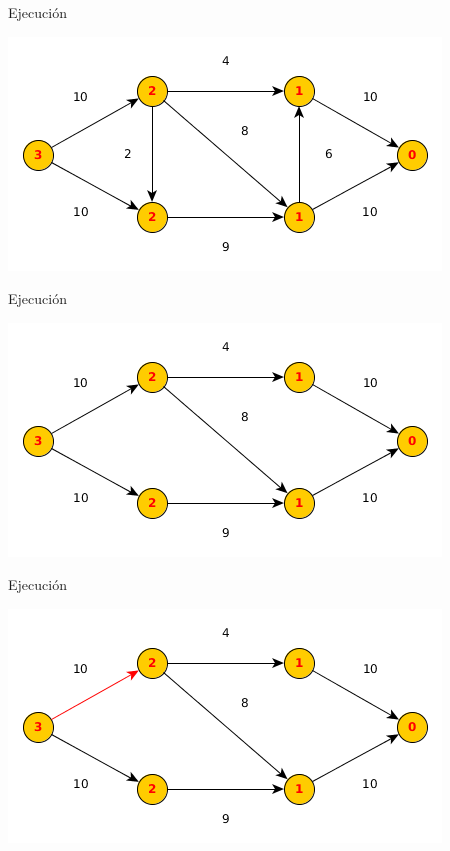 \documentclass{beamer}
\begin{document}
\begin{frame}{Ejecución}

    
    \includegraphics[scale=0.6]{dinitz/dinitz2.png}
    
\end{frame}

\begin{frame}{Ejecución}

    
    \includegraphics[scale=0.6]{dinitz/dinitz3.png}
    
\end{frame}

\begin{frame}{Ejecución}

    
    \includegraphics[scale=0.6]{dinitz/dinitz4.png}
    
\end{frame}
\end{document}
